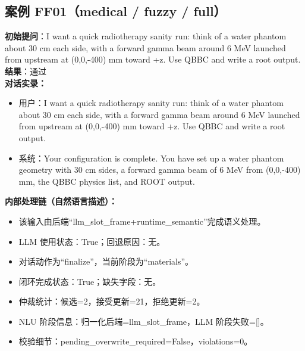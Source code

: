 \documentclass[11pt]{ctexart}
\begin{document}
\subsection{案例 FF01（medical / fuzzy / full）}
\textbf{初始提问}：I want a quick radiotherapy sanity run: think of a water phantom about 30 cm each side, with a forward gamma beam around 6 MeV launched from upstream at (0,0,-400) mm toward +z. Use QBBC and write a root output.\\
\textbf{结果}：通过\\
\textbf{对话实录：}
\begin{itemize}
\item 用户：I want a quick radiotherapy sanity run: think of a water phantom about 30 cm each side, with a forward gamma beam around 6 MeV launched from upstream at (0,0,-400) mm toward +z. Use QBBC and write a root output.
\item 系统：Your configuration is complete. You have set up a water phantom geometry with 30 cm sides, a forward gamma beam of 6 MeV from (0,0,-400) mm, the QBBC physics list, and ROOT output.
\end{itemize}
\textbf{内部处理链（自然语言描述）：}
\begin{itemize}
\item 该输入由后端“llm\_slot\_frame+runtime\_semantic”完成语义处理。
\item LLM 使用状态：True；回退原因：无。
\item 对话动作为“finalize”，当前阶段为“materials”。
\item 闭环完成状态：True；缺失字段：无。
\item 仲裁统计：候选=2，接受更新=21，拒绝更新=2。
\item NLU 阶段信息：归一化后端=llm\_slot\_frame，LLM 阶段失败=[]。
\item 校验细节：pending\_overwrite\_required=False，violations=0。
\end{itemize}
\end{document}
